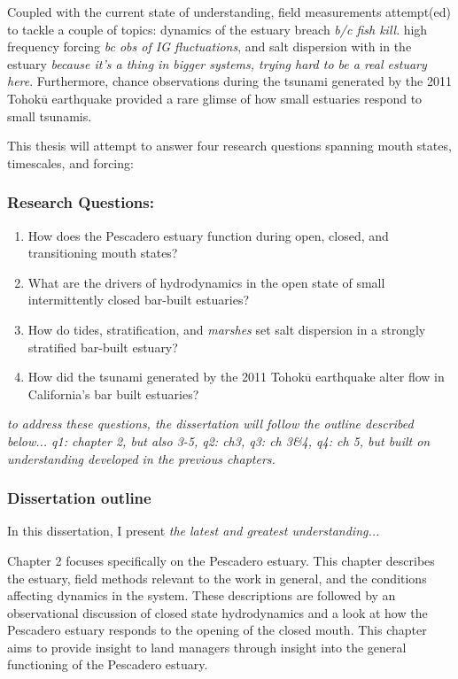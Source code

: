 Coupled with the current state of understanding, field measurements attempt(ed) to tackle a couple of topics: dynamics of the estuary breach \emph{b/c fish kill}. high frequency forcing \emph{bc obs of IG fluctuations}, and salt dispersion with in the estuary \emph{because it's a thing in bigger systems, trying hard to be a real estuary here}. Furthermore, chance observations during the tsunami generated by the 2011 Tohok$\overline{\mathrm{u}}$ earthquake provided a rare glimse of how small estuaries respond to small tsunamis. 

This thesis will attempt to answer four research questions spanning mouth states, timescales, and forcing: 


\subsubsection{Research Questions:}
\begin{enumerate}
	\item{How does the Pescadero estuary function during open, closed, and transitioning mouth states?}
	\item{What are the drivers of hydrodynamics in the open state of small intermittently closed bar-built estuaries?}
	\item{How do tides, stratification, and \emph{marshes} set salt dispersion in a strongly stratified bar-built estuary?}
	\item{How did the tsunami generated by the 2011 Tohok$\overline{\mathrm{u}}$ earthquake alter flow in California's bar built estuaries?}
\end{enumerate}

\emph{to address these questions, the dissertation will follow the outline described below... q1: chapter 2, but also 3-5, q2: ch3, q3: ch 3\&4, q4: ch 5, but built on understanding developed in the previous chapters.}


\subsubsection{Dissertation outline}

In this dissertation, I present \emph{the latest and greatest understanding...}

Chapter 2 focuses specifically on the Pescadero estuary. This chapter describes the estuary, field methods relevant to the work in general, and the conditions affecting dynamics in the system. These descriptions are followed by an observational discussion of closed state hydrodynamics and a look at how the Pescadero estuary responds to the opening of the closed mouth. This chapter aims to provide insight to land managers through insight into the general functioning of the Pescadero estuary.

